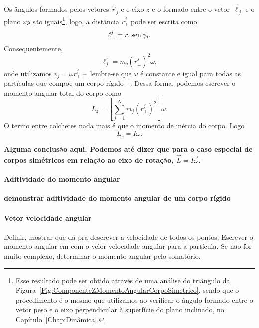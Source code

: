 Os ângulos formados pelos vetores $\vec{r}_j$ e o eixo $z$ e o formado entre o vetor $\vec{\ell}_j$ e o plano $xy$ são iguais\footnote{Esse resultado pode ser obtido através de uma análise do triângulo da Figura~\ref{Fig:ComponenteZMomentoAngularCorpoSimetrico}, sendo que o procedimento é o mesmo que utilizamos ao verificar o ângulo formado entre o vetor peso e o eixo perpendicular à superfície do plano inclinado, no Capítulo~\ref{Chap:Dinâmica}.}, logo, a distância $r_{\perp}^j$ pode ser escrita como
\begin{equation}
  \ell_{\perp}^j = r_j\operatorname{sen}\gamma_j.
\end{equation}
%
Consequentemente, 
\begin{equation}
  \ell_{j}^{z} = m_j (r_{\perp}^j)^2 \omega,
\end{equation}
%
onde utilizamos $v_j = \omega r_{\perp}^j$ --~lembre-se que $\omega$ é constante e igual para todas as partículas que compõe um corpo rígido~--. Dessa forma, podemos escrever o momento angular total do corpo como
\begin{equation}
  L_z = \left[\sum_{j=1}^N m_j (r_{\perp}^j)^2\right] \omega.
\end{equation}
%
O termo entre colchetes nada mais é que o momento de inércia do corpo. Logo
\begin{equation}
  L_z = I \omega.
\end{equation}

\textbf{Alguma conclusão aqui. Podemos até dizer que para o caso especial de corpos simétricos em relação ao eixo de rotação, $\vec{L} = I\vec{\omega}$.}

\paragraph{Aditividade do momento angular}

\textbf{demonstrar aditividade do momento angular de um corpo rígido}

\paragraph{Vetor velocidade angular}

Definir, mostrar que dá pra descrever a velocidade de todos os pontos. Escrever o momento angular em com o velor velocidade angular para a partícula. Se não for muito complexo, determinar o momento angular pelo somatório.

